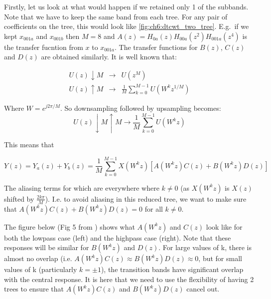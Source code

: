 \begin{figure}
  \centering
  
  \label{fig:ch6:dtcwt_two_tree}
\end{figure}

Firstly, let us look at what would happen if we retained only 1 of the subbands.
Note that we have to keep the same band from each tree. For any pair of
coefficients on the tree, this would look like \autoref{fig:ch6:dtcwt_two_tree}.
E.g.\ if we kept $x_{001a}$ and $x_{001b}$ then $M=8$ and $A(z) =
H_{0a}(z)H_{00a}(z^2)H_{001a}(z^4)$ is the transfer fucntion from $x$ to
$x_{001a}$. The transfer functions for $B(z)$, $C(z)$ and $D(z)$ are obtained
similarly. It is well known that:

\begin{eqnarray}
  U(z) \downarrow M &\rightarrow&  U(z^M) \\
  U(z) \uparrow M &\rightarrow & \frac{1}{M}\sum_{k=0}^{M-1}U(W^kz^{1/M})
\end{eqnarray}

Where $W=e^{j2\pi/M}$. So downsampling followed by upsampling becomes:
$$U(z) \downarrow M \uparrow M \rightarrow \frac{1}{M}\sum_{k=0}^{M-1}U(W^kz)$$

This means that

\begin{equation}
  Y(z) = Y_{a}(z) + Y_{b}(z) = \frac{1}{M} \sum_{k=0}^{M-1} X(W^k z) [A(W^kz)C(z) + B(W^kz)D(z)]
\end{equation}

The aliasing terms for which are everywhere where $k \neq 0$ (as $X(W^kz)$ is
$X(z)$ shifted by $\frac{2k\pi}{M}$). I.e. to avoid aliasing in this reduced
tree, we want to make sure that $A(W^kz)C(z) + B(W^kz)D(z) = 0$ for all $k \neq
0$.

The figure below (Fig 5 from \cite{kingsbury_complex_2001}) shows what $A(W^kz)$
and $C(z)$ look like for both the lowpass case (left) and the highpass case
(right). Note that these responses will be similar for $B(W^kz)$ and $D(z)$. For
large values of k, there is almost no overlap (i.e. 
$A(W^kz)C(z) \approx B(W^kz)D(z) \approx 0$, 
but for small values of k (particularly $k = \pm 1$),
the transition bands have significant overlap with the central response. It is
here that we need to use the flexibility of having 2 trees to ensure that
$A(W^kz)C(z)$ and $B(W^kz)D(z)$ cancel out.

